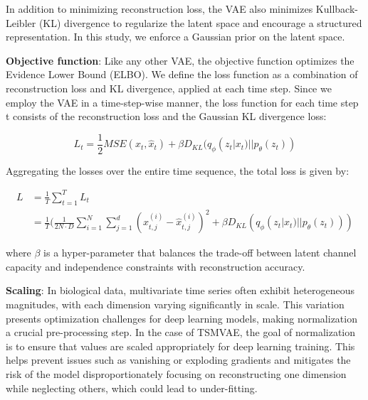 \documentclass[12pt]{article} %
\begin{document}
In addition to minimizing reconstruction loss, the VAE also minimizes Kullback-Leibler (KL) divergence to regularize the latent space and encourage a structured representation. In this study, we enforce a Gaussian prior on the latent space.

\textbf{Objective function}: Like any other VAE, the objective function optimizes the Evidence Lower Bound (ELBO). We define the loss function as a combination of reconstruction loss and KL divergence, applied at each time step. Since we employ the VAE in a time-step-wise manner, the loss function for each time step t consists of the reconstruction loss and the Gaussian KL divergence loss:

$$L_t = \frac{1}{2}MSE(x_t, \hat x_t) + \beta D_{KL}(q_{\phi}(z_{t}|x_{t})||p_{\theta}(z_{t}))$$

Aggregating the losses over the entire time sequence, the total loss is given by:

\begin{align*}
L &= \frac{1}{T}\sum_{t=1}^{T} L_t\\
&= \frac{1}{T}(\frac{1}{2N \cdot D}\sum_{i=1}^{N}\sum_{j=1}^d(x_{t,j}^{(i)} - \hat x_{t,j}^{(i)})^2 + \beta D_{KL}(q_{\phi}(z_{t}|x_{t})||p_{\theta}(z_{t})))
\end{align*}

where $\beta$ is a hyper-parameter that balances the trade-off between latent channel capacity and independence constraints with reconstruction accuracy\citep{higgins2017beta}.


%

\textbf{Scaling}: In biological data, multivariate time series often exhibit heterogeneous magnitudes, with each dimension varying significantly in scale. This variation presents optimization challenges for deep learning models, making normalization a crucial pre-processing step. In the case of TSMVAE, the goal of normalization is to ensure that values are scaled appropriately for deep learning training. This helps prevent issues such as vanishing or exploding gradients and mitigates the risk of the model disproportionately focusing on reconstructing one dimension while neglecting others, which could lead to under-fitting.
\end{document}
